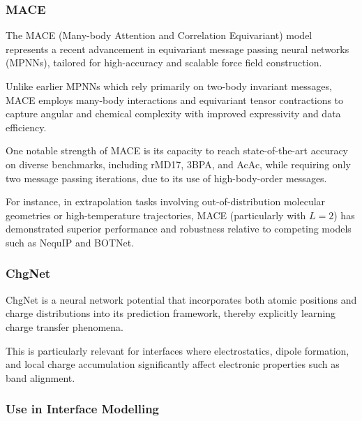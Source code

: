 
\subsubsection{MACE}


The MACE (Many-body Attention and Correlation Equivariant) model represents a recent advancement in equivariant message
passing neural networks (MPNNs), tailored for high-accuracy and scalable force field construction.

Unlike earlier MPNNs which rely primarily on two-body invariant messages, MACE employs many-body interactions and
equivariant tensor contractions to capture angular and chemical complexity with improved expressivity and data
efficiency.


One notable strength of MACE is its capacity to reach state-of-the-art accuracy on diverse benchmarks, including rMD17,
3BPA, and AcAc, while requiring only two message passing iterations, due to its use of high-body-order messages.

For instance, in extrapolation tasks involving out-of-distribution molecular geometries or high-temperature
trajectories, MACE (particularly with $L=2$) has demonstrated superior performance and robustness relative to competing
models such as NequIP and BOTNet.




\subsubsection{ChgNet}


ChgNet is a neural network potential that incorporates both atomic positions and charge distributions into its
prediction framework, thereby explicitly learning charge transfer phenomena.

This is particularly relevant for interfaces where electrostatics, dipole formation, and local charge accumulation
significantly affect electronic properties such as band alignment.



\subsubsection{Use in Interface Modelling}


